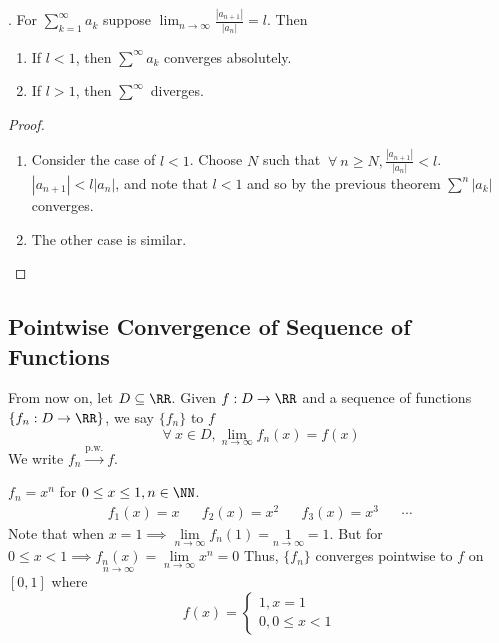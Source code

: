 \documentclass[12pt]{scrartcl}
\newcommand{\pw}{\overset{\text{p.w.}}{\longrightarrow}}
\begin{document}
\begin{theorem}
  . For $\sum_{k=1}^\infty a_k$ suppose $\lim_{n\to\infty} \frac{|a_{n+1}|}{|a_n|} = l$. Then \begin{enumerate} \item If $l < 1$, then $\sum^\infty a_k$ converges absolutely.
    \item If $l > 1$, then $\sum^\infty$ diverges.
  \end{enumerate}

  \begin{proof}

    \hfill

    \begin{enumerate}
      \item Consider the case of $l < 1$. Choose $N$ such that $\ \forall \ n\geq N, \frac{|a_{n+1}|}{|a_n|} < l$.
      $|a_{n+1}| < l|a_n|$, and note that $l < 1$ and so by the previous theorem 
      $\sum^n |a_k|$ converges.
      \item The other case is similar.
    \end{enumerate}
  \end{proof}
\end{theorem}

\subsection{Pointwise Convergence of Sequence of Functions}

\begin{definition}
  From now on, let $D \subseteq \RR$. Given $f: D \to \RR$ and a sequence 
  of functions $\{f_n: D \to \RR\}$, we say $\{f_n\}$  to $f$
  \[\ \forall \ x \in D, \lim_{n\to\infty} f_n(x) = f(x)\]
  We write $f_n \pw f$. 
\end{definition}

\begin{example}
  $f_n = x^n$ for $0 \leq x \leq 1, n \in \NN$. 
  \begin{align*}
    f_1(x) = x && f_2(x) = x^2 && f_3(x) = x^3 && \cdots
  \end{align*}
  Note that when $x=1 \implies \underset{n\to\infty}{\lim}f_n(1) = \underset{n\to\infty}{1} = 1$. 
  But for $0 \leq x < 1 \implies \underset{n\to\infty}{f_n(x)} = \underset{n\to\infty}{\lim}x^n = 0$
  Thus, $\{f_n\}$ converges pointwise to $f$ on $[0, 1]$ where 
  \[f(x) = \begin{cases}
    1, x = 1\\
    0, 0 \leq x < 1
  \end{cases}\]
\end{example}
\end{document}
